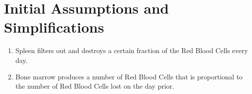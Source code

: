 \section{Initial Assumptions and Simplifications}
\label{sec:initial-assumptions-and-simplifications}

\begin{enumerate}
    \item Spleen filters out and destroys a certain fraction of the Red Blood Cells every day.
    \item Bone marrow produces a number of Red Blood Cells that is proportional to the number of Red Blood Cells lost on the day prior.
\end{enumerate}
